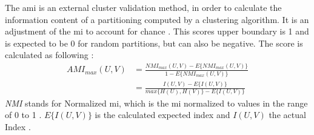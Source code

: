 The \acrshort{ami} is an external cluster validation method, in order to calculate the information content of a partitioning computed by a clustering algorithm. It is an adjustment of the \acrfull{mi} to account for chance \cite{scikitlearn}. This scores upper boundary is 1 and is expected to be 0 for random partitions, but can also be negative. The score is calculated as following \cite{ari_form}:
\begin{align}
    AMI_{max}(U,V) &= \frac{NMI_{max}(U,V)-E\{NMI_{max}(U,V)\}}{1-E\{NMI_{max}(U,V)\}}\\&= \frac{I(U,V)-E\{I(U,V)\}}{max\{H(U), H(V)\}-E\{I(U,V)\}} \nonumber
\end{align}
\textit{NMI} stands for Normalized \acrshort{mi}, which is the \acrshort{mi} normalized to values in the range of 0 to 1 \cite{scikitlearn}. $E\{I(U,V)\}$ is the calculated expected index and $I(U,V)$ the actual Index \cite{ari_form}.